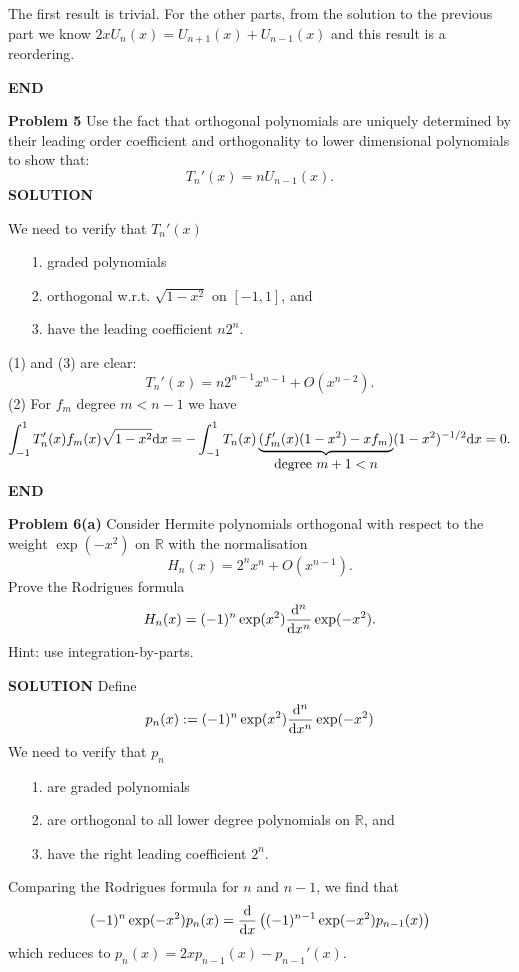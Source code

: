 \documentclass[12pt,a4paper]{article}
\def\bbR{ {\mathbb R} }
\begin{document}
The first result is trivial. For the other parts, from the solution to the previous part we know $2xU_n(x)=U_{n+1}(x)+U_{n-1}(x)$ and this result is a reordering.

\textbf{END}

\textbf{Problem 5}  Use the fact that orthogonal polynomials are uniquely determined by their leading order coefficient and orthogonality to lower dimensional polynomials to show that:
\[
T_n'(x) = n U_{n-1}(x).
\]
\textbf{SOLUTION}

We need to verify that $T_n'(x)$

\begin{itemize}
\item[1. ] graded polynomials


\item[2. ] orthogonal w.r.t. $\sqrt{1-x^2}$ on $[-1,1]$, and


\item[3. ] have the leading coefficient $n 2^n$.

\end{itemize}
(1) and (3) are clear:
\[
T_n'(x) = n 2^{n-1} x^{n-1} + O(x^{n-2}).
\]
(2) For $f_m$ degree $m < n-1$ we have
\[
\ensuremath{\int}_{-1}^1 T_n'(x) f_m(x) \sqrt{1-x^2} {\rm d}x =
-\ensuremath{\int}_{-1}^1 T_n(x) \underbrace{(f_m'(x)(1-x^2) -x f_m)}_{\hbox{degree $m+1 < n$}}  (1-x^2)^{-1/2} {\rm d}x = 0.
\]
\textbf{END}

\textbf{Problem 6(a)} Consider Hermite polynomials orthogonal with respect to the weight $\exp(-x^2)$ on $\ensuremath{\bbR}$ with the normalisation
\[
H_n(x) = 2^n x^n + O(x^{n-1}).
\]
Prove the Rodrigues formula
\[
H_n(x) = (-1)^n \exp(x^2) {{\rm d}^n \over {\rm d}x^n} \exp(-x^2).
\]
Hint: use integration-by-parts.

\textbf{SOLUTION} Define
\[
p_n(x) := (-1)^n \exp(x^2) {{\rm d}^n \over {\rm d}x^n} \exp(-x^2)
\]
We need to verify that $p_n$

\begin{itemize}
\item[1. ] are graded polynomials


\item[2. ] are orthogonal to all lower degree polynomials on $\mathbb{R}$, and


\item[3. ] have the right leading coefficient $2^n$.

\end{itemize}
Comparing the Rodrigues formula for $n$ and $n-1$, we find that
\[
(-1)^n\exp(-x^2)p_n(x)={{\rm d} \over {\rm d}x}\left((-1)^{n-1}\exp(-x^2)p_{n-1}(x)\right)
\]
which reduces to $p_n(x)=2xp_{n-1}(x)-p_{n-1}'(x).$
\end{document}
